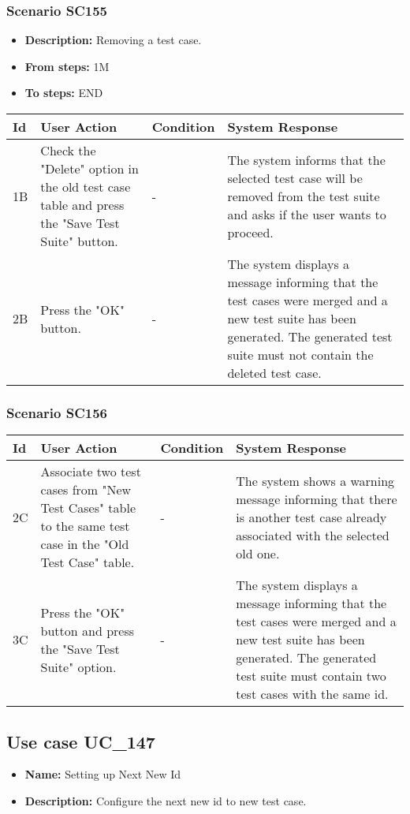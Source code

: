 \documentclass[a4paper,11pt]{article}
\newcommand{\bl}{\\ \hline}
\begin{document}
\subsubsection*{Scenario SC155}
\begin{itemize}
\item {\bf Description:} Removing a test case.
\item {\bf From steps:} 1M
\item {\bf To steps:} END
\end{itemize}
\begin{tabular}{|p{0.4in}|p{1.5in}|p{1.5in}|p{1.5in}|}
\hline
Id & User Action & Condition & System Response \bl 
1B & Check the "Delete" option in the old test case table and
						press the "Save Test Suite" button. & - & The system informs that the selected test case will be
						removed from the test suite and asks if the user wants to proceed.
					\bl
2B & Press the "OK" button. & - & The system displays a message informing that the test
						cases were merged and a new test suite has been generated. The
						generated test suite must not contain the deleted test case.
					\bl
\end{tabular}
\subsubsection*{Scenario SC156}
\begin{tabular}{|p{0.4in}|p{1.5in}|p{1.5in}|p{1.5in}|}
\hline
Id & User Action & Condition & System Response \bl 
2C & Associate two test cases from "New Test Cases" table to the
						same test case in the "Old Test Case" table. & - & The system shows a warning message informing that there
						is another test case already associated with the selected old one.
					\bl
3C & Press the "OK" button and press the "Save Test Suite"
						option. & - & The system displays a message informing that the test
						cases were merged and a new test suite has been generated. The
						generated test suite must contain two test cases with the same id.
					\bl
\end{tabular}
\subsection*{Use case UC_147}
\begin{itemize}
\item {\bf Name: }Setting up Next New Id
\item {\bf Description: }Configure the next new id to new test case.
			
\end{itemize}
\end{document}
